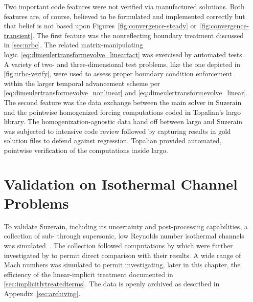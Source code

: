 Two important code features were not verified via manufactured solutions.  Both
features are, of course, believed to be formulated and implemented correctly but
that belief is not based upon Figures~\ref{fig:convergence-steady}
or~\ref{fig:convergence-transient}.  The first feature was the nonreflecting
boundary treatment discussed in \autoref{sec:nrbc}.  The related
matrix-manipulating logic~\eqref{eq:dimeulertransformevolve_linearfact} was
exercised by automated tests.  A variety of two- and three-dimensional test
problems, like the one depicted in \autoref{fig:nrbc-verify}, were used to
assess proper boundary condition enforcement within the larger temporal
advancement scheme per \eqref{eq:dimeulertransformevolve_nonlinear} and
\eqref{eq:dimeulertransformevolve_linear}.
%
%
The second feature was the data exchange between the main solver in Suzerain and
the pointwise homogenized forcing computations coded in Topalian's
largo library.  The homogenization-agnostic data hand off between largo and
Suzerain was subjected to intensive code review followed by capturing results in
gold solution files to defend against regression.
%
%
Topalian provided automated, pointwise verification of the computations
inside largo.


\section{Validation on Isothermal Channel Problems}
\label{sec:channel_runs}

To validate Suzerain, including its uncertainty and post-processing
capabilities, a collection of sub- through supersonic, low Reynolds number
isothermal channels was simulated~\citep{Ulerich2012Turbulence}.  The collection
followed computations by \citet{Coleman1995Numerical} which were further
investigated by \citet{Huang1995Compressible} to permit direct comparison with
their results.  A wide range of Mach numbers was simulated to permit investigating, later
in this chapter, the efficiency of the linear-implicit treatment documented in
\autoref{sec:implicitlytreatedterms}.
%
The data is openly archived as described in Appendix~\ref{sec:archiving}.

